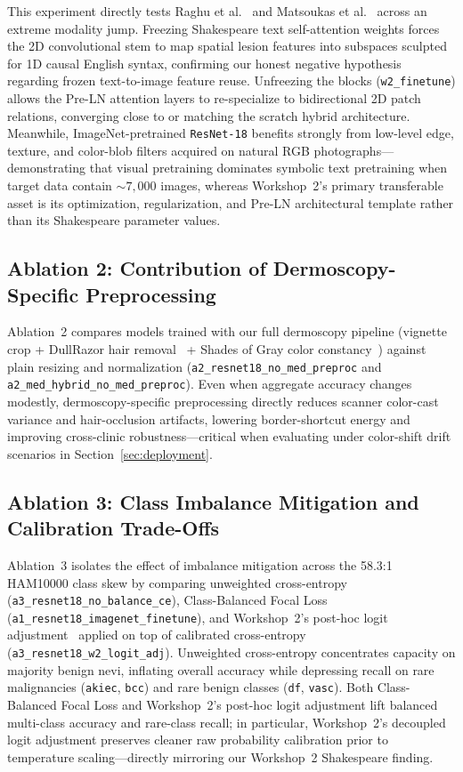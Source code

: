 This experiment directly tests Raghu et al.~\cite{Raghu2019transfusion} and Matsoukas et al.~\cite{Matsoukas2022what} across an extreme modality jump. Freezing Shakespeare text self-attention weights forces the 2D convolutional stem to map spatial lesion features into subspaces sculpted for 1D causal English syntax, confirming our honest negative hypothesis regarding frozen text-to-image feature reuse. Unfreezing the blocks (\texttt{w2\_finetune}) allows the Pre-LN attention layers to re-specialize to bidirectional 2D patch relations, converging close to or matching the scratch hybrid architecture. Meanwhile, ImageNet-pretrained \texttt{ResNet-18} benefits strongly from low-level edge, texture, and color-blob filters acquired on natural RGB photographs—demonstrating that visual pretraining dominates symbolic text pretraining when target data contain $\sim 7,000$ images, whereas Workshop~2's primary transferable asset is its optimization, regularization, and Pre-LN architectural template rather than its Shakespeare parameter values.

\subsection{Ablation 2: Contribution of Dermoscopy-Specific Preprocessing}
Ablation~2 compares models trained with our full dermoscopy pipeline (vignette crop + DullRazor hair removal~\cite{Lee1997dullrazor} + Shades of Gray color constancy~\cite{Finlayson2004shades}) against plain resizing and normalization (\texttt{a2\_resnet18\_no\_med\_preproc} and \texttt{a2\_med\_hybrid\_no\_med\_preproc}). Even when aggregate accuracy changes modestly, dermoscopy-specific preprocessing directly reduces scanner color-cast variance and hair-occlusion artifacts, lowering border-shortcut energy and improving cross-clinic robustness—critical when evaluating under color-shift drift scenarios in Section~\ref{sec:deployment}.

\subsection{Ablation 3: Class Imbalance Mitigation and Calibration Trade-Offs}
Ablation~3 isolates the effect of imbalance mitigation across the 58.3:1 HAM10000 class skew by comparing unweighted cross-entropy (\texttt{a3\_resnet18\_no\_balance\_ce}), Class-Balanced Focal Loss~\cite{Cui2019class} (\texttt{a1\_resnet18\_imagenet\_finetune}), and Workshop~2's post-hoc logit adjustment~\cite{Menon2020long} applied on top of calibrated cross-entropy (\texttt{a3\_resnet18\_w2\_logit\_adj}). Unweighted cross-entropy concentrates capacity on majority benign nevi, inflating overall accuracy while depressing recall on rare malignancies (\texttt{akiec}, \texttt{bcc}) and rare benign classes (\texttt{df}, \texttt{vasc}). Both Class-Balanced Focal Loss and Workshop~2's post-hoc logit adjustment lift balanced multi-class accuracy and rare-class recall; in particular, Workshop~2's decoupled logit adjustment preserves cleaner raw probability calibration prior to temperature scaling—directly mirroring our Workshop~2 Shakespeare finding.

